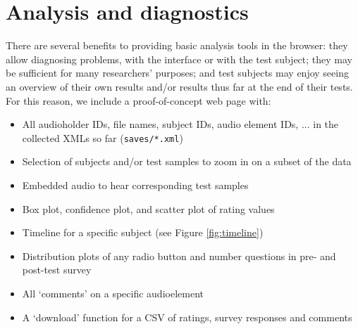 \documentclass{sig-alternate}
\begin{document}
\section{Analysis and diagnostics}
\label{sec:analysis}
	There are several benefits to providing basic analysis tools in the browser: they allow diagnosing problems, with the interface or with the test subject; they may be sufficient for many researchers' purposes; and test subjects may enjoy seeing an overview of their own results and/or results thus far at the end of their tests. 
	For this reason, we include a proof-of-concept web page with:
	\begin{itemize}[noitemsep,nolistsep]
		\item All audioholder IDs, file names, subject IDs, audio element IDs, ... in the collected XMLs so far (\texttt{saves/*.xml})
		\item Selection of subjects and/or test samples to zoom in on a subset of the data %
		\item Embedded audio to hear corresponding test samples %
		\item Box plot, confidence plot, and scatter plot of rating values
		\item Timeline for a specific subject (see Figure \ref{fig:timeline})%
		\item Distribution plots of any radio button and number questions in pre- and post-test survey %
		\item All `comments' on a specific audioelement
		\item A `download' function for a CSV of ratings, survey responses and comments%
	\end{itemize}
\end{document}
